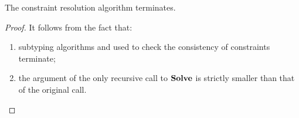 \begin{theorem}%
\label{thm:solvectr-terminates}
    The constraint resolution algorithm \solvectrdflt terminates.
\end{theorem}
\begin{proof}
    It follows from the fact that:
    \begin{enumerate}
        \item subtyping algorithms  and 
             used to check the consistency of 
            constraints terminate;
        \item the argument \UEnv of the only recursive call to $\operatorname{\mathbf{Solve}}$
            is strictly smaller than that of the original call.
    \end{enumerate} 
\end{proof}


